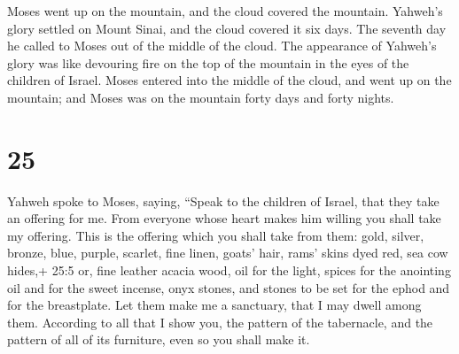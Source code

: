  Moses went up on the mountain, and the cloud covered the
mountain.  Yahweh's glory settled on Mount Sinai, and the
cloud covered it six days. The seventh day he called to Moses out of the
middle of the cloud.  The appearance of Yahweh's glory was
like devouring fire on the top of the mountain in the eyes of the
children of Israel.  Moses entered into the middle of the
cloud, and went up on the mountain; and Moses was on the mountain forty
days and forty nights.

\hypertarget{section-24}{%
\section{25}\label{section-24}}

 Yahweh spoke to Moses, saying,  ``Speak to the
children of Israel, that they take an offering for me. From everyone
whose heart makes him willing you shall take my offering. 
This is the offering which you shall take from them: gold, silver,
bronze,  blue, purple, scarlet, fine linen, goats' hair,
 rams' skins dyed red, sea cow hides,+ 25:5 or, fine leather
acacia wood,  oil for the light, spices for the anointing
oil and for the sweet incense,  onyx stones, and stones to
be set for the ephod and for the breastplate.  Let them make
me a sanctuary, that I may dwell among them.  According to
all that I show you, the pattern of the tabernacle, and the pattern of
all of its furniture, even so you shall make it.

